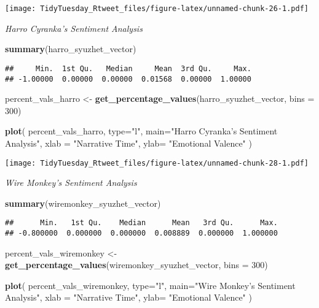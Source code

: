 \documentclass[]{article}
\newenvironment{Shaded}{\begin{snugshade}}{\end{snugshade}}
\newcommand{\DataTypeTok}[1]{\textcolor[rgb]{0.13,0.29,0.53}{#1}}
\newcommand{\DecValTok}[1]{\textcolor[rgb]{0.00,0.00,0.81}{#1}}
\newcommand{\KeywordTok}[1]{\textcolor[rgb]{0.13,0.29,0.53}{\textbf{#1}}}
\newcommand{\NormalTok}[1]{#1}
\newcommand{\StringTok}[1]{\textcolor[rgb]{0.31,0.60,0.02}{#1}}
\begin{document}
\texttt{[image: TidyTuesday\_Rtweet\_files/figure-latex/unnamed-chunk-26-1.pdf]}

\emph{Harro Cyranka's Sentiment Analysis}

\begin{Shaded}
\begin{Highlighting}[]
\KeywordTok{summary}\NormalTok{(harro_syuzhet_vector)}
\end{Highlighting}
\end{Shaded}

\begin{verbatim}
##     Min.  1st Qu.   Median     Mean  3rd Qu.     Max. 
## -1.00000  0.00000  0.00000  0.01568  0.00000  1.00000
\end{verbatim}

\begin{Shaded}
\begin{Highlighting}[]
\NormalTok{percent_vals_harro <-}\StringTok{ }\KeywordTok{get_percentage_values}\NormalTok{(harro_syuzhet_vector, }\DataTypeTok{bins =} \DecValTok{300}\NormalTok{)}

\KeywordTok{plot}\NormalTok{(}
\NormalTok{  percent_vals_harro, }
  \DataTypeTok{type=}\StringTok{"l"}\NormalTok{, }
  \DataTypeTok{main=}\StringTok{"Harro Cyranka's Sentiment Analysis"}\NormalTok{, }
  \DataTypeTok{xlab =} \StringTok{"Narrative Time"}\NormalTok{, }
  \DataTypeTok{ylab=} \StringTok{"Emotional Valence"}
\NormalTok{  )}
\end{Highlighting}
\end{Shaded}

\texttt{[image: TidyTuesday\_Rtweet\_files/figure-latex/unnamed-chunk-28-1.pdf]}

\emph{Wire Monkey's Sentiment Analysis}

\begin{Shaded}
\begin{Highlighting}[]
\KeywordTok{summary}\NormalTok{(wiremonkey_syuzhet_vector)}
\end{Highlighting}
\end{Shaded}

\begin{verbatim}
##      Min.   1st Qu.    Median      Mean   3rd Qu.      Max. 
## -0.800000  0.000000  0.000000  0.008889  0.000000  1.000000
\end{verbatim}

\begin{Shaded}
\begin{Highlighting}[]
\NormalTok{percent_vals_wiremonkey <-}\StringTok{ }\KeywordTok{get_percentage_values}\NormalTok{(wiremonkey_syuzhet_vector, }\DataTypeTok{bins =} \DecValTok{300}\NormalTok{)}

\KeywordTok{plot}\NormalTok{(}
\NormalTok{  percent_vals_wiremonkey, }
  \DataTypeTok{type=}\StringTok{"l"}\NormalTok{, }
  \DataTypeTok{main=}\StringTok{"Wire Monkey's Sentiment Analysis"}\NormalTok{, }
  \DataTypeTok{xlab =} \StringTok{"Narrative Time"}\NormalTok{, }
  \DataTypeTok{ylab=} \StringTok{"Emotional Valence"}
\NormalTok{  )}
\end{Highlighting}
\end{Shaded}
\end{document}

